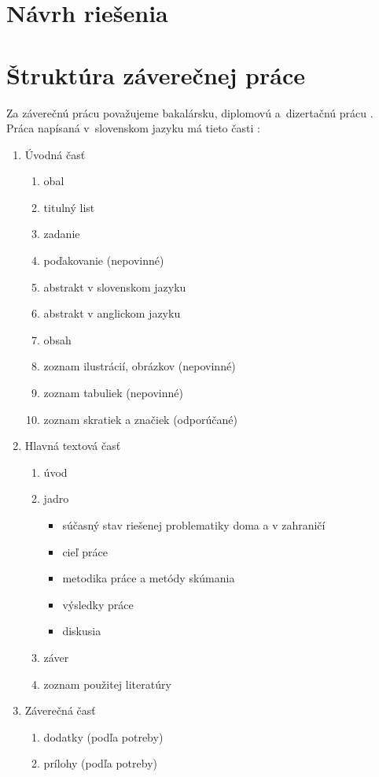 \section{Návrh riešenia}

\iffalse
\section{Štruktúra záverečnej práce}\label{sec:StrukturaPrace}
Za záverečnú prácu považujeme bakalársku, diplomovú
a~dizertačnú prácu \cite{zakon1312002}.
Práca napísaná v~slovenskom jazyku má tieto časti \cite{vyhlaska2332011, usmernenie562011}:
\begin{enumerate}
    \item Úvodná časť
    \begin{enumerate}
        \item obal
        \item titulný list
        \item zadanie
        \item poďakovanie (nepovinné)
        \item abstrakt v slovenskom jazyku
        \item abstrakt v anglickom jazyku
        \item obsah
        \item zoznam ilustrácií, obrázkov (nepovinné)
        \item zoznam tabuliek (nepovinné)
        \item zoznam skratiek a značiek (odporúčané)
    \end{enumerate}
    \item Hlavná textová časť
    \begin{enumerate}
        \item úvod
        \item jadro
        \begin{itemize}
            \item súčasný stav riešenej problematiky doma a v zahraničí
            \item cieľ práce
            \item metodika práce a metódy skúmania
            \item výsledky práce
            \item diskusia
        \end{itemize}
        \item záver
        \item zoznam použitej literatúry
    \end{enumerate}
    \item Záverečná časť
    \begin{enumerate}
        \item dodatky (podľa potreby)
        \item prílohy (podľa potreby)
    \end{enumerate}
\end{enumerate}

